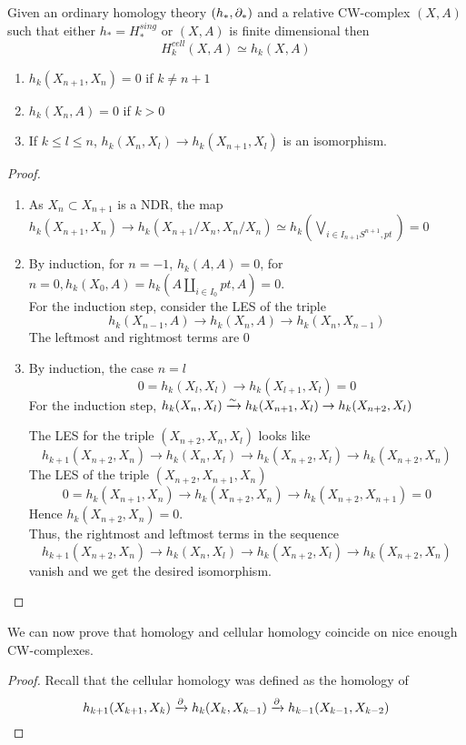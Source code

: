 \documentclass[../main.tex]{subfiles}
\begin{document}
\begin{thm}
	Given an ordinary homology theory $( h_\ast,\partial_\ast) $ and a relative CW-complex $( X,A) $ such that either $h_\ast=H_\ast^{sing}$ or $( X,A) $ is finite dimensional then
	\[ 
	H_k^{cell}( X,A) \simeq h_k( X,A) 
	\]
	
\end{thm}
\begin{lemma}
\begin{enumerate}
\item $h_k( X_{n+1} ,X_n) =0$ if $k\neq n+1$ 
\item $h_k( X_n,A) =0 $ if $k>0$ 
\item If $k \leq l \leq n$,  $h_k( X_n,X_l) \to h_k( X_{n+1} ,X_l) $ is an isomorphism.
\end{enumerate}

\end{lemma}
\begin{proof}
	\begin{enumerate}
	\item As $X_n \subset X_{n+1} $ is a NDR, the map $h_k( X_{n+1} ,X_n) \to h_k ( X_{n+1} /X_n, X_n/X_n) \simeq h_k ( \bigvee_{i \in I_{n+1} S^{n+1},pt} ) =0$ 
	\item By induction, for $n=-1$, $h_k( A,A) =0$, for $n=0, h_k( X_0,A) = h_k( A\coprod_{i\in I_0} pt, A) = 0$.\\
		For the induction step, consider the LES of the triple
		\[ 
		h_k( X_{n-1} ,A) \to h_k( X_n,A) \to h_k( X_n,X_{n-1} ) 
		\]
		The leftmost and rightmost terms are 0
	\item By induction, the case $n=l$ 
		\[ 
		0=h_k( X_l,X_l) \to h_k( X_{l+1} , X_l) =0
		\]
		For the induction step, $h_k( X_n,X_l )\xrightarrow{\sim}  h_k( X_{n+1} ,X_l) \to h_k( X_{n+2} , X_l) $ 	
		
		The LES for the triple $( X_{n+2} ,X_n,X_l) $ looks like
		\[ 
		h_{k+1} ( X_{n+2} ,X_n) \to h_k(  X_n,X_l) \to h_k( X_{n+2} ,X_l) \to h_k( X_{n+2} ,X_n) 
		\]
		The LES of the triple $( X_{n+2} ,X_{n+1} ,X_n) $ 
		\[ 
		0=h_k( X_{n+1} ,X_n) \to h_k( X_{n+2} ,X_n) \to h_k( X_{n+2} ,X_{n+1} ) =0
		\]
		Hence $h_k( X_{n+2} ,X_n) =0$.\\
		Thus, the rightmost and leftmost terms in the sequence
		\[ 
		h_{k+1} ( X_{n+2} ,X_n) \to h_k(  X_n,X_l) \to h_k( X_{n+2} ,X_l) \to h_k( X_{n+2} ,X_n) 
		\]
		vanish and we get the desired isomorphism.
	\end{enumerate}
\end{proof}
We can now prove that homology and cellular homology coincide on nice enough CW-complexes.
\begin{proof}
Recall that the cellular homology was defined as the homology of
\[ 
	h_{k+1} ( X_{k+1} ,X_k) \xrightarrow{\partial} h_k( X_k,X_{k-1} ) \xrightarrow{\partial} h_{k-1} ( X_{k-1} ,X_{k-2} )
\]

\end{proof}
\end{document}
